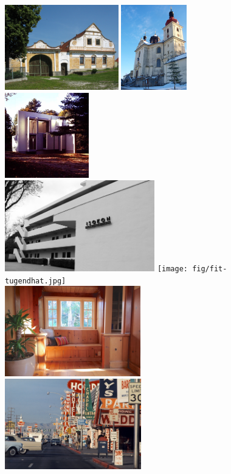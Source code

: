 \begin{figure}[t]
\vspace{-1em}
\includegraphics[height=10em]{fig/fit-jihocesky.jpg}\quad
\includegraphics[height=10em]{fig/fit-dobravoda.jpg}\quad
\includegraphics[height=10em]{fig/fit-house-vi.jpg}\\[1em]
\includegraphics[height=10.7em]{fig/fit-isokon.jpg}\quad
\texttt{[image: fig/fit-tugendhat.jpg]}\\[1em]
\includegraphics[height=10.6em]{fig/fit-sala-house.jpg}\quad
\includegraphics[height=10.6em]{fig/fit-strip.jpg}\quad

\end{figure}
